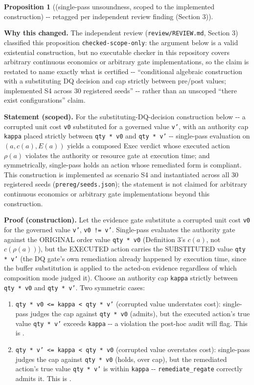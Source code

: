 \documentclass[11pt,a4paper]{article}
\theoremstyle{definition}
\newtheorem{proposition}{Proposition}
\begin{document}
\begin{proposition}[(single-pass unsoundness, scoped to the implemented construction) -{}- retagged per independent review finding (Section 3)]
\label{prop:3}

\noindent\textbf{Why this changed.} The independent review (\texttt{review/REVIEW.md}, Section 3) classified this proposition \texttt{checked-scope-only}: the argument below is a valid existential construction, but no executable checker in this repository covers arbitrary continuous economics or arbitrary gate implementations, so the claim is restated to name exactly what is certified -{}- ``conditional algebraic construction with a substituting DQ decision and cap strictly between pre/post values; implemented S4 across 30 registered seeds'' -{}- rather than an unscoped ``there exist configurations'' claim.

\noindent\textbf{Statement (scoped).} For the substituting-DQ-decision construction below -{}- a corrupted unit cost \texttt{v0} substituted for a governed value \texttt{v'}, with an authority cap \texttt{kappa} placed strictly between \texttt{qty * v0} and \texttt{qty * v'} -{}- single-pass evaluation on $(a, c(a), E(a))$ yields a composed Exec verdict whose executed action $\rho(a)$ violates the authority or resource gate at execution time; and symmetrically, single-pass holds an action whose remediated form is compliant. This construction is implemented as scenario S4 and instantiated across all 30 registered seeds (\texttt{prereg/seeds.json}); the statement is not claimed for arbitrary continuous economics or arbitrary gate implementations beyond this construction.

\noindent\textbf{Proof (construction).} Let the evidence gate substitute a corrupted unit cost \texttt{v0} for the governed value \texttt{v'}, \texttt{v0 != v'}. Single-pass evaluates the authority gate against the ORIGINAL order value \texttt{qty * v0} (Definition 3's $c(a)$, not $c(\rho(a))$), but the EXECUTED action carries the SUBSTITUTED value \texttt{qty * v'} (the DQ gate's own remediation already happened by execution time, since the buffer substitution is applied to the acted-on evidence regardless of which composition mode judged it). Choose an authority cap \texttt{kappa} strictly between \texttt{qty * v0} and \texttt{qty * v'}. Two symmetric cases:

\begin{enumerate}
\item \texttt{qty * v0 <= kappa < qty * v'} (corrupted value understates cost): single-pass judges the cap against \texttt{qty * v0} (admits), but the executed action's true value \texttt{qty * v'} exceeds \texttt{kappa} -{}- a violation the post-hoc audit will flag. This is .
\item \texttt{qty * v' <= kappa < qty * v0} (corrupted value overstates cost): single-pass judges the cap against \texttt{qty * v0} (holds, over cap), but the remediated action's true value \texttt{qty * v'} is within \texttt{kappa} -{}- \texttt{remediate\_regate} correctly admits it. This is .
\end{enumerate}


\end{proposition}
\end{document}
